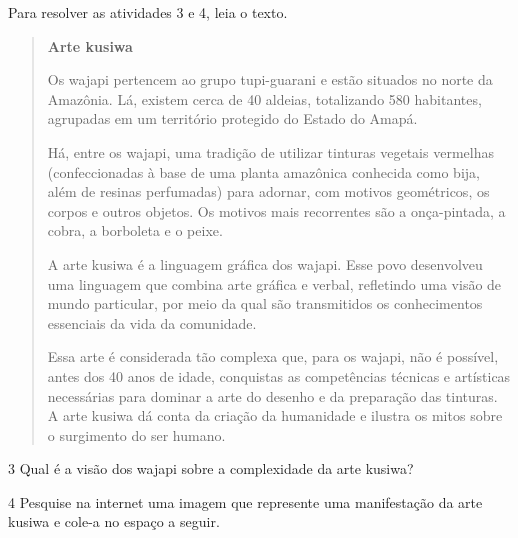 Para resolver as atividades 3 e 4, leia o texto.

\begin{quote}
\textbf{Arte kusiwa}

Os wajapi pertencem ao grupo tupi-guarani e estão situados no norte da
Amazônia. Lá, existem cerca de 40 aldeias, totalizando 580 habitantes,
agrupadas em um território protegido do Estado do Amapá.

Há, entre os wajapi, uma tradição de utilizar tinturas vegetais vermelhas
(confeccionadas à base de uma planta amazônica conhecida como bija, além
de resinas perfumadas) para adornar, com motivos geométricos, os corpos e
outros objetos. Os motivos mais recorrentes são a onça-pintada, a cobra, a
borboleta e o peixe.

A arte kusiwa é a linguagem gráfica dos wajapi. Esse povo
desenvolveu uma linguagem que combina arte gráfica e verbal, refletindo uma
visão de mundo particular, por meio da qual são transmitidos os conhecimentos
essenciais da vida da comunidade.

Essa arte é considerada tão complexa que, para os wajapi, não é possível, antes
dos 40 anos de idade, conquistas as competências técnicas e artísticas necessárias
para dominar a arte do desenho e da preparação das tinturas. A arte kusiwa dá conta
da criação da humanidade e ilustra os mitos sobre o surgimento do ser humano.

\end{quote}


\num{3}  Qual é a visão dos wajapi sobre a complexidade da arte kusiwa?



\num{4}  Pesquise na internet uma imagem que represente uma manifestação da
arte kusiwa e cole-a no espaço a seguir.

\begin{mdframed}[linewidth=2pt,linecolor=salmao,roundcorner=20pt]
\vspace{6cm}
\end{mdframed}



